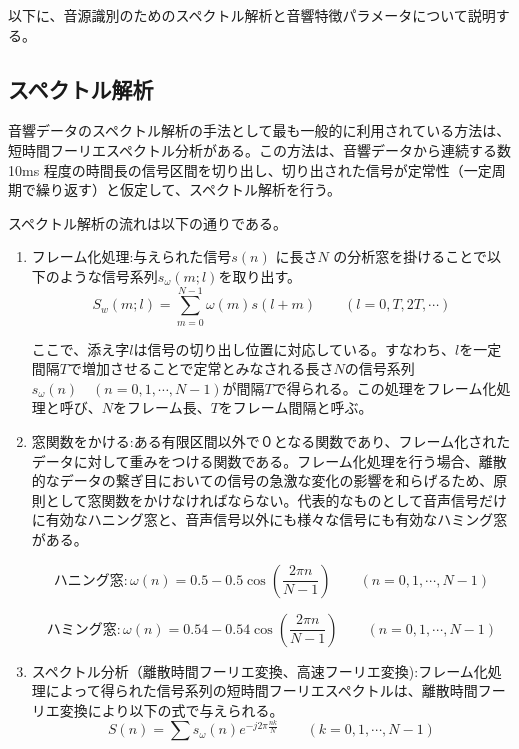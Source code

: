 以下に、音源識別のためのスペクトル解析と音響特徴パラメータについて説明する。\par


\subsection{スペクトル解析}
音響データのスペクトル解析の手法として最も一般的に利用されている方法は、短時間フーリエスペクトル分析がある。この方法は、音響データから連続する数10ms 程度の時間長の信号区間を切り出し、切り出された信号が定常性（一定周期で繰り返す）と仮定して、スペクトル解析を行う。\par
スペクトル解析の流れは以下の通りである。

\begin{enumerate}
\item フレーム化処理:与えられた信号$s(n)$ に長さ$N$ の分析窓を掛けることで以下のような信号系列$s_\omega(m; l)$を取り出す。
\begin{equation}
S_w(m;l)=\sum_{m=0}^{N-1}\omega(m)s(l+m)\qquad(l=0,T,2T,\cdots)
\end{equation}

ここで、添え字$l$は信号の切り出し位置に対応している。すなわち、$l$を一定間隔$T$で増加させることで定常とみなされる長さ$N$の信号系列$s_\omega(n)\quad (n=0,1,\cdots,N-1)$が間隔$T$で得られる。この処理をフレーム化処理と呼び、$N$をフレーム長、$T$をフレーム間隔と呼ぶ。

\item 窓関数をかける:ある有限区間以外で０となる関数であり、フレーム化されたデータに対して重みをつける関数である。フレーム化処理を行う場合、離散的なデータの繋ぎ目においての信号の急激な変化の影響を和らげるため、原則として窓関数をかけなければならない。代表的なものとして音声信号だけに有効なハニング窓と、音声信号以外にも様々な信号にも有効なハミング窓がある。

\begin{equation}
\label{da1}
ハニング窓:\omega(n)=0.5-0.5\cos(\frac{2\pi n}{N-1})\qquad(n=0,1,\cdots,N-1)
\end{equation}

\begin{equation}
\label{da2}
ハミング窓:\omega(n)=0.54-0.54\cos(\frac{2\pi n}{N-1})\qquad(n=0,1,\cdots,N-1)
\end{equation}

\item スペクトル分析（離散時間フーリエ変換、高速フーリエ変換):フレーム化処理によって得られた信号系列の短時間フーリエスペクトルは、離散時間フーリエ変換により以下の式で与えられる。
\begin{equation}
S(n)=\sum s_\omega(n)e^{-j2\pi \frac{nk}{N}} \qquad (k=0,1,\cdots,N-1)
\end{equation}


\end{enumerate}
